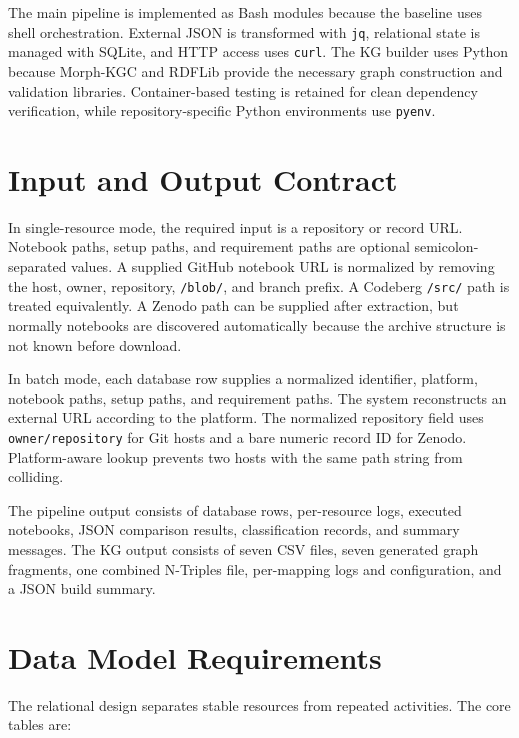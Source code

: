 The main pipeline is implemented as Bash modules because the baseline uses shell orchestration. External JSON is transformed with \texttt{jq}, relational state is managed with SQLite, and HTTP access uses \texttt{curl}. The KG builder uses Python because Morph-KGC and RDFLib provide the necessary graph construction and validation libraries. Container-based testing is retained for clean dependency verification, while repository-specific Python environments use \texttt{pyenv}.

\section{Input and Output Contract}

In single-resource mode, the required input is a repository or record URL. Notebook paths, setup paths, and requirement paths are optional semicolon-separated values. A supplied GitHub notebook URL is normalized by removing the host, owner, repository, \texttt{/blob/}, and branch prefix. A Codeberg \texttt{/src/} path is treated equivalently. A Zenodo path can be supplied after extraction, but normally notebooks are discovered automatically because the archive structure is not known before download.

In batch mode, each database row supplies a normalized identifier, platform, notebook paths, setup paths, and requirement paths. The system reconstructs an external URL according to the platform. The normalized repository field uses \texttt{owner/repository} for Git hosts and a bare numeric record ID for Zenodo. Platform-aware lookup prevents two hosts with the same path string from colliding.

The pipeline output consists of database rows, per-resource logs, executed notebooks, JSON comparison results, classification records, and summary messages. The KG output consists of seven CSV files, seven generated graph fragments, one combined N-Triples file, per-mapping logs and configuration, and a JSON build summary.

\section{Data Model Requirements}

The relational design separates stable resources from repeated activities. The core tables are:

